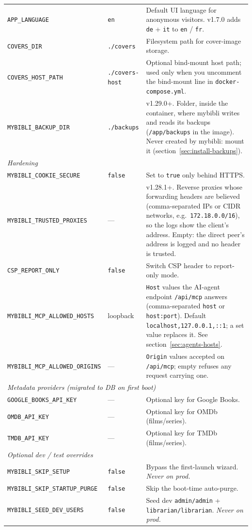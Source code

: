 {\begin{longtable}{l l >{\raggedright\arraybackslash}p{6.2cm}}
\texttt{APP\_LANGUAGE}        & \texttt{en}     & Default UI language for anonymous visitors. v1.7.0 adds \texttt{de} + \texttt{it} to \texttt{en} / \texttt{fr}. \\
\texttt{COVERS\_DIR}          & \texttt{./covers} & Filesystem path for cover-image storage. \\
\texttt{COVERS\_HOST\_PATH}   & \texttt{./covers-host} & Optional bind-mount host path; used only when you uncomment the bind-mount line in \texttt{docker-compose.yml}. \\
\texttt{MYBIBLI\_BACKUP\_DIR} & \texttt{./backups} & v1.29.0+. Folder, inside the container, where mybibli writes and reads its backups (\texttt{/app/backups} in the image). Never created by mybibli: mount it (section~\ref{sec:install-backups}). \\
\midrule
\multicolumn{3}{l}{\emph{Hardening}} \\
\texttt{MYBIBLI\_COOKIE\_SECURE} & \texttt{false} & Set to \texttt{true} only behind HTTPS. \\
\texttt{MYBIBLI\_TRUSTED\_PROXIES} & --- & v1.28.1+. Reverse proxies whose forwarding headers are believed (comma-separated IPs or CIDR networks, e.g.\ \texttt{172.18.0.0/16}), so the logs show the client's address. Empty: the direct peer's address is logged and no header is trusted. \\
\texttt{CSP\_REPORT\_ONLY}     & \texttt{false} & Switch CSP header to report-only mode. \\
\texttt{MYBIBLI\_MCP\_ALLOWED\_HOSTS} & loopback & \texttt{Host} values the AI-agent endpoint \texttt{/api/mcp} answers (comma-separated \texttt{host} or \texttt{host:port}). Default \texttt{localhost,127.0.0.1,::1}; a set value replaces it. See section~\ref{sec:agents-hosts}. \\
\texttt{MYBIBLI\_MCP\_ALLOWED\_ORIGINS} & --- & \texttt{Origin} values accepted on \texttt{/api/mcp}; empty refuses any request carrying one. \\
\midrule
\multicolumn{3}{l}{\emph{Metadata providers (migrated to DB on first boot)}} \\
\texttt{GOOGLE\_BOOKS\_API\_KEY} & --- & Optional key for Google Books. \\
\texttt{OMDB\_API\_KEY}         & --- & Optional key for OMDb (films/series). \\
\texttt{TMDB\_API\_KEY}         & --- & Optional key for TMDb (films/series). \\
\midrule
\multicolumn{3}{l}{\emph{Optional dev / test overrides}} \\
\texttt{MYBIBLI\_SKIP\_SETUP}      & \texttt{false} & Bypass the first-launch wizard. \emph{Never on prod.} \\
\texttt{MYBIBLI\_SKIP\_STARTUP\_PURGE} & \texttt{false} & Skip the boot-time auto-purge. \\
\texttt{MYBIBLI\_SEED\_DEV\_USERS} & \texttt{false} & Seed dev \texttt{admin/admin} + \texttt{librarian/librarian}. \emph{Never on prod.} \\
\bottomrule
\end{longtable}
}


